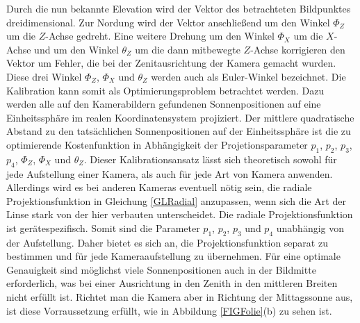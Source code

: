 \documentclass[a4paper,11pt,twoside,german]{article}
\newcommand{\absatz}{\smallbreak} %
\begin{document}
Durch die nun bekannte Elevation wird der Vektor des betrachteten Bildpunktes
dreidimensional. Zur Nordung wird der Vektor anschließend um den Winkel $\Phi_Z$
um die $Z$-Achse gedreht. Eine weitere Drehung um den Winkel $\Phi_X$ um die
$X$-Achse und um den Winkel $\theta_Z$ um die dann mitbewegte $Z$-Achse
korrigieren den Vektor um Fehler, die bei der Ze\-nit\-aus\-rich\-tung der
Kamera gemacht wurden. Diese drei Winkel $\Phi_Z$, $\Phi_X$ und $\theta_Z$
werden auch als Euler-Winkel bezeichnet.
\absatz
Die Kalibration kann somit als Optimierungsproblem betrachtet werden. Dazu
werden alle auf den Kamerabildern gefundenen Sonnenpositionen auf eine
Einheitssphäre im realen Koordinatensystem projiziert. Der mittlere quadratische
Abstand zu den tatsächlichen Sonnenpositionen auf der Einheitssphäre ist die zu
optimierende Kostenfunktion in Ab\-häng\-ig\-keit der Projetionsparameter $p_1$,
$p_2$, $p_3$, $p_4$, $\Phi_Z$, $\Phi_X$ und $\theta_Z$.
\absatz
Dieser Kalibrationsansatz lässt sich theoretisch sowohl für jede Aufstellung
einer Kamera, als auch für jede Art von Kamera anwenden. Allerdings wird es bei
anderen Kameras eventuell nötig sein, die radiale Projektionsfunktion in
Gleichung \ref{GLRadial} anzupassen, wenn sich die Art der Linse stark von der
hier verbauten unterscheidet.
\absatz
Die radiale Projektionsfunktion ist gerätespezifisch. Somit sind die Parameter 
$p_1$, $p_2$, $p_3$ und $p_4$ unabhängig von der Aufstellung. Daher bietet es
sich an, die Projektionsfunktion separat zu bestimmen und für jede
Kameraaufstellung zu übernehmen. Für eine optimale Genauigkeit sind
möglichst viele Sonnenpositionen auch in der Bildmitte erforderlich, was bei
einer Ausrichtung in den Zenith in den mittleren Breiten nicht erfüllt ist.
Richtet man die Kamera aber in Richtung der Mittagssonne aus, ist diese
Vorraussetzung erfüllt, wie in Abbildung \ref{FIGFolie}(b) zu sehen ist.
\end{document}
